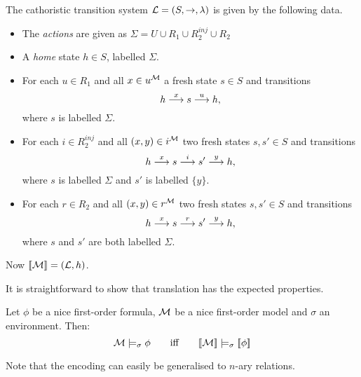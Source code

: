 The cathoristic transition system $\mathcal{L} = (S, \rightarrow, \lambda)$ is given by
the following data.
\begin{itemize}

\item The \emph{actions} are given as $\Sigma = U \cup R_1 \cup
  R_2^{inj} \cup R_2$

\item A \emph{home} state $h \in S$, labelled $\Sigma$.

\item For each $u \in R_1$ and all $x \in u^{\mathcal{M}}$ a fresh state
  $s \in S$ and transitions
\[
   h \stackrel{x}{\longrightarrow} s \stackrel{u}{\longrightarrow} h,
\]
where $s$ is labelled $\Sigma$.

\item For each $i \in R_2^{inj}$ and all $(x, y)  \in
i^{\mathcal{M}}$ two fresh states $s, s' \in S$ and transitions
\[
   h \stackrel{x}{\longrightarrow} s \stackrel{i}{\longrightarrow} s' \stackrel{y}{\longrightarrow} h,
\]
where $s$ is labelled $\Sigma$ and $s'$ is labelled $\{y\}$.

\item For each $r \in R_2$ and all $(x, y)  \in                                                                         
r^{\mathcal{M}}$ two fresh states $s, s' \in S$ and transitions
\[
   h \stackrel{x}{\longrightarrow} s \stackrel{r}{\longrightarrow} s' \stackrel{y}{\longrightarrow} h,
\]
where $s$ and $s'$ are both labelled $\Sigma$.

\end{itemize}

\NI Now $\lbrack\!\lbrack \mathcal{M} \rbrack\!\rbrack = (\mathcal{L}, h)$.

It is straightforward to show that translation has the expected 
properties.

\begin{theorem}
Let $\phi$ be a nice first-order formula, $\mathcal{M}$ be a nice
first-order model and $\sigma$ an environment. Then:
\[
   \mathcal{M} \models_{\sigma} \phi
      \qquad\text{iff}\qquad
   \lbrack\!\lbrack \mathcal{M} \rbrack\!\rbrack \models_{\sigma} \lbrack\!\lbrack \phi \rbrack\!\rbrack
\]
\end{theorem}

\NI Note that the encoding can easily be generalised to $n$-ary
relations.
